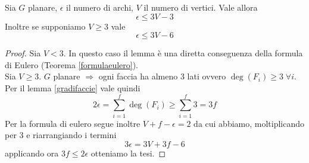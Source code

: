\begin{lemma}
    Sia \(G\) planare, \(\epsilon\) il numero di archi, \(V\) il numero di vertici. Vale allora
    \begin{equation}
        \epsilon \leq 3V - 3
    \end{equation}
    Inoltre se supponiamo \(V \geq 3\) vale
    \begin{equation}
        \epsilon \leq 3V - 6
    \end{equation}
\end{lemma}
\begin{proof}
    Sia \(V<3\). In questo caso il lemma è una diretta conseguenza della formula di Eulero (Teorema {\ref{formulaeulero}}). \\
    Sia \(V\geq 3\). \(G\) planare \(\Rightarrow\) ogni faccia ha almeno 3 lati ovvero \(\deg(F_i) \geq 3\; \forall i\). Per il lemma {\ref{gradifaccie}} vale quindi
    \begin{equation}
        2\epsilon = \sum_{i=1}^f \deg(F_i) \geq \sum_{i=1}^f 3 = 3f
    \end{equation}
    Per la formula di eulero segue inoltre \(V+f-\epsilon = 2\) da cui abbiamo, moltiplicando per 3 e riarrangiando i termini
    \begin{equation}
        3\epsilon = 3V + 3f - 6
    \end{equation}
    applicando ora \(3f\leq 2 \epsilon\) otteniamo la tesi.
\end{proof}
